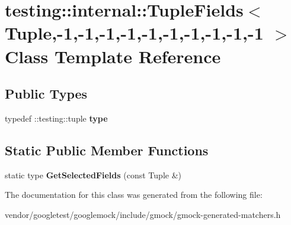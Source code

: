 \hypertarget{classtesting_1_1internal_1_1TupleFields_3_01Tuple_00-1_00-1_00-1_00-1_00-1_00-1_00-1_00-1_00-1_00-1_01_4}{}\section{testing\+:\+:internal\+:\+:Tuple\+Fields$<$ Tuple,-\/1,-\/1,-\/1,-\/1,-\/1,-\/1,-\/1,-\/1,-\/1,-\/1 $>$ Class Template Reference}
\label{classtesting_1_1internal_1_1TupleFields_3_01Tuple_00-1_00-1_00-1_00-1_00-1_00-1_00-1_00-1_00-1_00-1_01_4}
\subsection*{Public Types}
\begin{DoxyCompactItemize}
\item 
typedef \+::testing\+::tuple {\bfseries type}\hypertarget{classtesting_1_1internal_1_1TupleFields_3_01Tuple_00-1_00-1_00-1_00-1_00-1_00-1_00-1_00-1_00-1_00-1_01_4_addfc4b7d727aa8e4c7838a378a573bf6}{}\label{classtesting_1_1internal_1_1TupleFields_3_01Tuple_00-1_00-1_00-1_00-1_00-1_00-1_00-1_00-1_00-1_00-1_01_4_addfc4b7d727aa8e4c7838a378a573bf6}

\end{DoxyCompactItemize}
\subsection*{Static Public Member Functions}
\begin{DoxyCompactItemize}
\item 
static type {\bfseries Get\+Selected\+Fields} (const Tuple \&)\hypertarget{classtesting_1_1internal_1_1TupleFields_3_01Tuple_00-1_00-1_00-1_00-1_00-1_00-1_00-1_00-1_00-1_00-1_01_4_a903907f35d09b8b0f4e4e2778c1350f7}{}\label{classtesting_1_1internal_1_1TupleFields_3_01Tuple_00-1_00-1_00-1_00-1_00-1_00-1_00-1_00-1_00-1_00-1_01_4_a903907f35d09b8b0f4e4e2778c1350f7}

\end{DoxyCompactItemize}


The documentation for this class was generated from the following file\+:\begin{DoxyCompactItemize}
\item 
vendor/googletest/googlemock/include/gmock/gmock-\/generated-\/matchers.\+h\end{DoxyCompactItemize}
